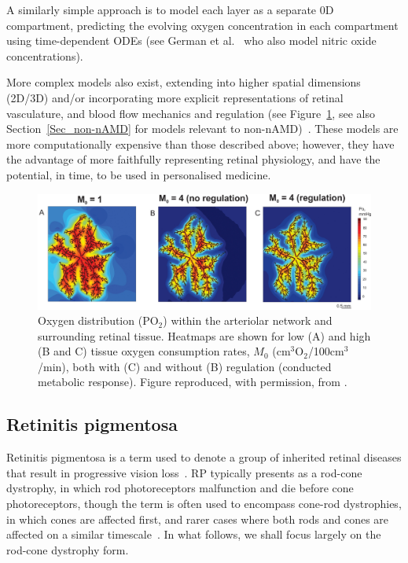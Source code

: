 \documentclass{article}
\begin{document}
A similarly simple approach is to model each layer as a separate 0D compartment, predicting the evolving oxygen concentration in each compartment using time-dependent ODEs (see German et al.~\cite{German_et_al_2021} who also model nitric oxide concentrations).

More complex models also exist, extending into higher spatial dimensions (2D/3D) and/or incorporating more explicit representations of retinal vasculature, and blood flow mechanics and regulation (see Figure~\ref{Fig_Fry2020}, see also Section~\ref{Sec_non-nAMD} for models relevant to non-nAMD)~\cite{Aquah_et_al_2021,Arciero_et_al_2021,Causin_2015,Friedland_1978,Fry_et_al_2018,Fry_et_al_2020,Linsenmeier_and_Zhang_2017,McDougall_et_al_2012,Watson_et_al_2012}.
These models are more computationally expensive than those described above; however, they have the advantage of more faithfully representing retinal physiology, and have the potential, in time, to be used in personalised medicine.
%
\begin{figure}
\begin{center}
\includegraphics[scale=0.95]{Fry_et_al_2020_Fig_3_ABC}
\end{center}
\caption{Oxygen distribution (PO$_2$) within the arteriolar network and surrounding retinal tissue. Heatmaps are shown for low (A) and high (B and C) tissue oxygen consumption rates, $M_0$ (cm$^3$O$_2$/100cm$^3$/min), both with (C) and without (B) regulation (conducted metabolic response). Figure reproduced, with permission, from \citet{Fry_et_al_2020}.}
\label{Fig_Fry2020}
\end{figure}
%
%
\subsection{Retinitis pigmentosa}\label{Sec_RP}
%
Retinitis pigmentosa is a term used to denote a group of inherited retinal diseases that result in progressive vision loss~\cite{Hamel_2006,Hartong_et_al_2006}. RP typically presents as a rod-cone dystrophy, in which rod photoreceptors malfunction and die before cone photoreceptors, though the term is often used to encompass cone-rod dystrophies, in which cones are affected first, and rarer cases where both rods and cones are affected on a similar timescale~\cite{Hamel_2006,Hartong_et_al_2006}. In what follows, we shall focus largely on the rod-cone dystrophy form.
\end{document}
